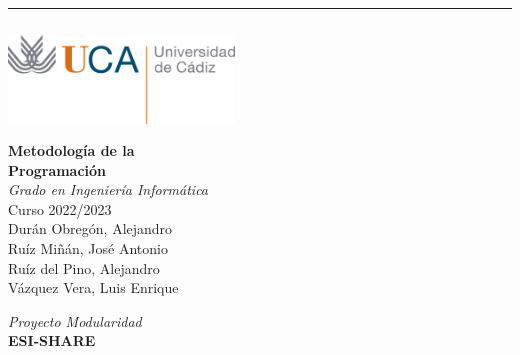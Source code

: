 

\begin{titlepage} 
  \raggedleft
  \rule{1.25pt}{\textheight} 
  \hspace{0.05\textwidth} 
  \parbox[b]{0.9\textwidth}{
    {\includegraphics[width=6cm,height=3cm]{uca}}\\[1\baselineskip]
    {\Huge\bfseries Metodología de la \\ Programación}\\[1\baselineskip] 
    {\huge\textit{Grado en Ingeniería Informática}}\\[1\baselineskip]

    {\large Curso 2022/2023}\\[2\baselineskip]
    
    {\large {Durán Obregón, Alejandro}}\\[0.3cm]
    {\large {Ruíz Miñán, José Antonio}}\\[0.3cm]
    {\large {Ruíz del Pino, Alejandro}}\\[0.3cm]
    {\large {Vázquez Vera, Luis Enrique}}\\[0.3cm]
  
    \vspace{0.25\textheight}
    
    {\Large\textit{Proyecto Modularidad}}\\[0.5cm]
    {\Large\textbf{ESI-SHARE}}\\
  }
\end{titlepage}


